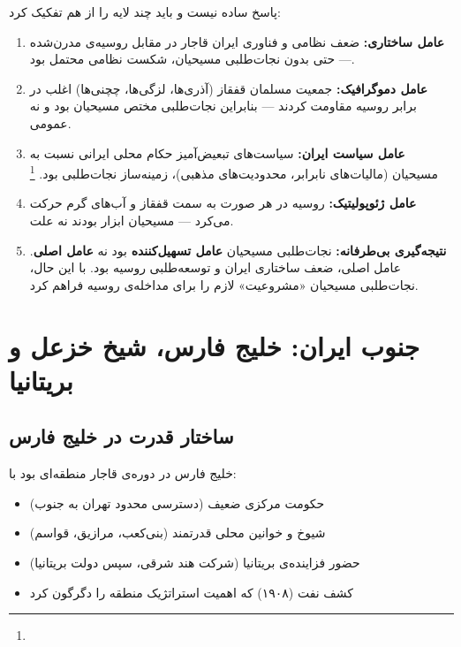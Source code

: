 \begin{tcolorbox}[defbox, title={پرسش حساس: آیا نجات‌طلبی مسیحیان قفقاز باعث از دست‌رفتن قفقاز شد؟}]
پاسخ ساده نیست و باید چند لایه را از هم تفکیک کرد:

\begin{enumerate}[nosep, label=\textbf{\arabic*.}]
  \item \textbf{عامل ساختاری:} ضعف نظامی و فناوری ایران قاجار در مقابل روسیه‌ی مدرن‌شده — حتی بدون نجات‌طلبی مسیحیان، شکست نظامی محتمل بود.

  \item \textbf{عامل دموگرافیک:} جمعیت مسلمان قفقاز (آذری‌ها، لزگی‌ها، چچنی‌ها) اغلب در برابر روسیه مقاومت کردند — بنابراین نجات‌طلبی مختص مسیحیان بود و نه عمومی.

  \item \textbf{عامل سیاست ایران:} سیاست‌های تبعیض‌آمیز حکام محلی ایرانی نسبت به مسیحیان (مالیات‌های نابرابر، محدودیت‌های مذهبی)، زمینه‌ساز نجات‌طلبی بود.%
  \footnote{}

  \item \textbf{عامل ژئوپولیتیک:} روسیه در هر صورت به سمت قفقاز و آب‌های گرم حرکت می‌کرد — مسیحیان ابزار بودند نه علت.

  \item \textbf{نتیجه‌گیری بی‌طرفانه:} نجات‌طلبی مسیحیان \textbf{عامل تسهیل‌کننده} بود نه \textbf{عامل اصلی}. عامل اصلی، ضعف ساختاری ایران و توسعه‌طلبی روسیه بود. با این حال، نجات‌طلبی مسیحیان «مشروعیت» لازم را برای مداخله‌ی روسیه فراهم کرد.
\end{enumerate}
\end{tcolorbox}

\section{جنوب ایران: خلیج فارس، شیخ خزعل و بریتانیا}
\label{sec:ch06-persian-gulf}

\subsection{ساختار قدرت در خلیج فارس}
\label{subsec:ch06-gulf-structure}

خلیج فارس در دوره‌ی قاجار منطقه‌ای بود با:
\begin{itemize}[nosep, rightmargin=1em]
  \item حکومت مرکزی ضعیف (دسترسی محدود تهران به جنوب)
  \item شیوخ و خوانین محلی قدرتمند (بنی‌کعب، مرازیق، قواسم)
  \item حضور فزاینده‌ی بریتانیا (شرکت هند شرقی، سپس دولت بریتانیا)
  \item کشف نفت (۱۹۰۸) که اهمیت استراتژیک منطقه را دگرگون کرد
\end{itemize}

